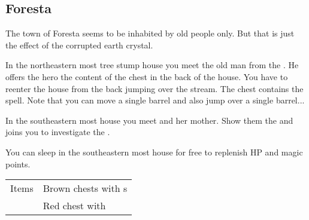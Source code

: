 \subsection{Foresta}
\label{map:foresta}

The town of Foresta seems to be inhabited by old people only. But that is just the effect of the corrupted earth crystal.

In the northeastern most tree stump house you meet the old man from the . He offers the hero the content of the chest in the back of the house. You have to reenter the house from the back jumping over the stream. The chest contains the  spell. Note that you can move a single barrel and also jump over a single barrel...

In the southeastern most house you meet  and her mother. Show them the  and  joins you to investigate the .

You can sleep in the southeastern most house for free to replenish HP and magic points.

\noindent\begin{tabularx}{\textwidth}[l]{lX}
	Items
	& Brown chests with \nameref{item:cure_potion}s \\
	& Red chest with \nameref{spell:cure}
\end{tabularx}
